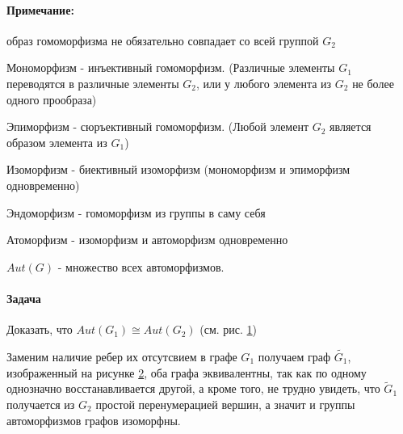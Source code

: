 \paragraph{Примечание:} образ гомоморфизма не обязательно совпадает со всей группой $G_2$

\begin{Def}
	Мономорфизм - инъективный гомоморфизм. (Различные элементы $G_1$ переводятся в различные элементы $G_2$, или у любого элемента из $G_2$ не более одного прообраза)
\end{Def}

\begin{Def}
	Эпиморфизм - сюръективный гомоморфизм. (Любой элемент $G_2$ является образом элемента из $G_1$)
\end{Def}

\begin{Def}
	Изоморфизм - биективный изоморфизм (мономорфизм и эпиморфизм одновременно)
\end{Def}

\begin{Def}
	Эндоморфизм - гомоморфизм из группы в саму себя
\end{Def}

\begin{Def}
	Атоморфизм - изоморфизм и автоморфизм одновременно
\end{Def}

\begin{Def}
	$Aut(G)$ - множество всех автоморфизмов.
\end{Def}

\begin{figure}[h]
	\begin{minipage}[h]{0.4\linewidth}
		\noindent{}
	\end{minipage}
	\hfill
	\begin{minipage}[h]{0.4\linewidth}
		\noindent{}	\end{minipage}
	\label{pic::graphs}
\end{figure}

\paragraph{Задача} Доказать, что $Aut(G_1) \cong Aut(G_2)$ (см. рис. \ref{pic::graphs})

\begin{Solution}
\begin{figure}[h]
	\noindent{}
	\label{pic::tilde_graph}
\end{figure}

	Заменим наличие ребер их отсутсвием в графе $G_1$ получаем граф $\tilde {G_1}$, изображенный на рисунке \ref{pic::tilde_graph}, оба графа эквивалентны, так как по одному однозначно восстанавливается другой, а кроме того, не трудно увидеть, что $\tilde G_1$ получается из $G_2$ простой перенумерацией вершин, а значит и группы автоморфизмов графов изоморфны.
\end{Solution}
